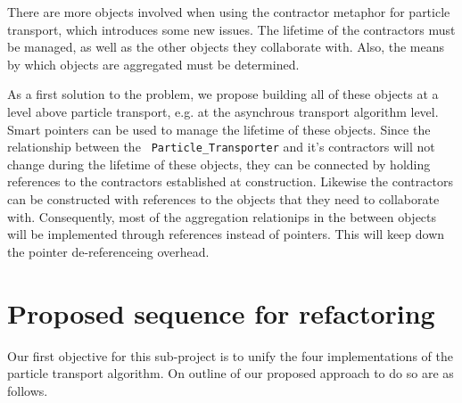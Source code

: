 \documentclass[memo]{ResearchNote}
\begin{document}
There are more objects involved when using the contractor metaphor for
particle transport, which introduces some new issues. The lifetime of
the contractors must be managed, as well as the other objects they
collaborate with. Also, the means by which objects are aggregated must
be determined.

As a first solution to the problem, we propose building all of these
objects at a level above particle transport, e.g. at the asynchrous
transport algorithm level. Smart pointers can be used to manage the
lifetime of these objects. Since the relationship between the {\tt
  Particle\_Transporter} and it's contractors will not change during
the lifetime of these objects, they can be connected by holding
references to the contractors established at construction. Likewise
the contractors can be constructed with references to the objects that
they need to collaborate with. Consequently, most of the aggregation
relationips in the between objects will be implemented through
references instead of pointers. This will keep down the pointer
de-referenceing overhead.

\section{Proposed sequence for refactoring}

Our first objective for this sub-project is to unify the four
implementations of the particle transport algorithm. On outline of our
proposed approach to do so are as follows.
\end{document}
